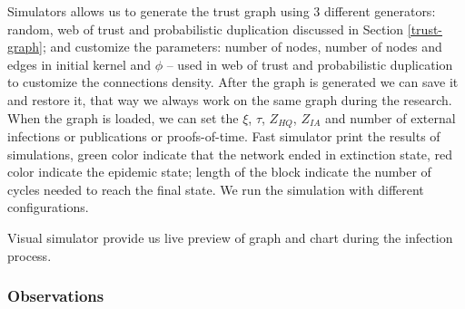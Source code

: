 \documentclass[nostrict]{szablonPG}
\begin{document}
Simulators allows us to generate the trust graph using 3 different generators: random, web of trust and probabilistic duplication discussed in Section \ref{trust-graph}; and customize the parameters: number of nodes, number of nodes and edges in initial kernel and $\phi$ -- used in web of trust and probabilistic duplication to customize the connections density. After the graph is generated we can save it and restore it, that way we always work on the same graph during the research. 
When the graph is loaded, we can set the $\xi$, $\tau$, $Z_{HQ}$, $Z_{IA}$ and number of external infections or publications or proofs-of-time.
Fast simulator print the results of simulations, green color indicate that the network ended in extinction state, red color indicate the epidemic state; length of the block indicate the number of cycles needed to reach the final state. 
We run the simulation with different configurations.

Visual simulator provide us live preview of graph and chart during the infection process.  


\subsubsection{Observations}
\label{observations}
\end{document}
